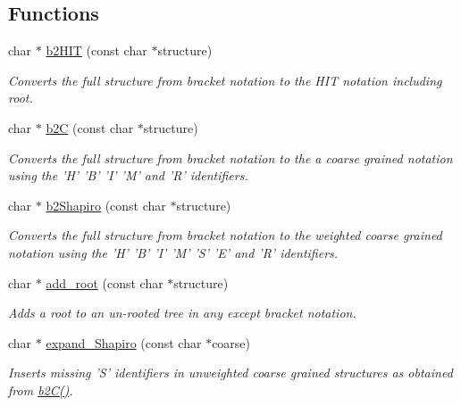 \subsection*{Functions}
\begin{DoxyCompactItemize}
\item 
char $\ast$ \hyperlink{group__struct__utils_ga07b7e90e712559a1992fba3ac6d21bbd}{b2\-H\-I\-T} (const char $\ast$structure)
\begin{DoxyCompactList}\small\item\em Converts the full structure from bracket notation to the H\-I\-T notation including root. \end{DoxyCompactList}\item 
char $\ast$ \hyperlink{group__struct__utils_ga9c80d92391f2833549a8b6dac92233f0}{b2\-C} (const char $\ast$structure)
\begin{DoxyCompactList}\small\item\em Converts the full structure from bracket notation to the a coarse grained notation using the 'H' 'B' 'I' 'M' and 'R' identifiers. \end{DoxyCompactList}\item 
char $\ast$ \hyperlink{group__struct__utils_ga5cd2feb367feeacad0c03cb7ddba5f10}{b2\-Shapiro} (const char $\ast$structure)
\begin{DoxyCompactList}\small\item\em Converts the full structure from bracket notation to the {\itshape weighted} coarse grained notation using the 'H' 'B' 'I' 'M' 'S' 'E' and 'R' identifiers. \end{DoxyCompactList}\item 
char $\ast$ \hyperlink{group__struct__utils_ga880d33066dd95441e5fbb73c57ed1c3e}{add\-\_\-root} (const char $\ast$structure)
\begin{DoxyCompactList}\small\item\em Adds a root to an un-\/rooted tree in any except bracket notation. \end{DoxyCompactList}\item 
char $\ast$ \hyperlink{group__struct__utils_gabe3d815b420dc4553bfb23511198b4c6}{expand\-\_\-\-Shapiro} (const char $\ast$coarse)
\begin{DoxyCompactList}\small\item\em Inserts missing 'S' identifiers in unweighted coarse grained structures as obtained from \hyperlink{group__struct__utils_ga9c80d92391f2833549a8b6dac92233f0}{b2\-C()}. \end{DoxyCompactList}\item 

\end{DoxyCompactItemize}
